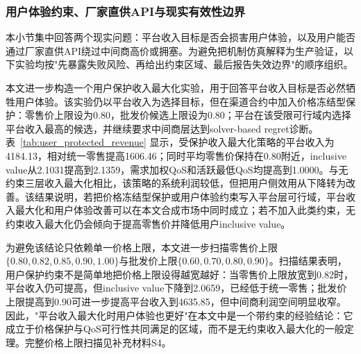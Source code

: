 \documentclass[UTF8,11pt]{ctexart}
\begin{document}
\subsubsection{用户体验约束、厂家直供API与现实有效性边界}
\label{sec:realism_validation}

本小节集中回答两个现实问题：平台收入目标是否会损害用户体验，以及用户能否通过厂家直供API绕过中间商高价或拥塞。为避免把机制仿真解释为生产验证，以下实验均按"先暴露失败风险、再给出约束区域、最后报告失效边界"的顺序组织。

本文进一步构造一个用户保护收入最大化实验，用于回答平台收入目标是否必然牺牲用户体验。该实验仍以平台收入为选择目标，但在渠道合约中加入价格冻结型保护：零售价上限设为0.80，批发价候选上限设为0.80；平台在该受限可行域内选择平台收入最高的候选，并继续要求中间商层达到solver-based regret诊断。表~\ref{tab:user_protected_revenue} 显示，受保护收入最大化策略的平台收入为4184.13，相对统一零售提高1606.46；同时平均零售价保持在0.80附近，inclusive value从2.1031提高到2.1359，需求加权QoS和活跃最低QoS均提高到1.0000。与无约束三层收入最大化相比，该策略的系统利润较低，但把用户侧效用从下降转为改善。该结果说明，若把价格冻结型保护或用户体验约束写入平台层可行域，平台收入最大化和用户体验改善可以在本文合成市场中同时成立；若不加入此类约束，无约束收入最大化仍会倾向于提高零售价并降低用户inclusive value。

\begin{table}[H]
\centering
\caption{用户保护约束下的平台收入最大化}
\label{tab:user_protected_revenue}
\small
{}
\end{table}

为避免该结论只依赖单一价格上限，本文进一步扫描零售价上限$\{0.80,0.82,0.85,0.90,1.00\}$与批发价上限$\{0.60,0.70,0.80,0.90\}$。扫描结果表明，用户保护约束不是简单地把价格上限设得越宽越好：当零售价上限放宽到0.82时，平台收入仍可提高，但inclusive value下降到2.0659，已经低于统一零售；批发价上限提高到0.90可进一步提高平台收入到4635.85，但中间商利润空间明显收窄。因此，"平台收入最大化时用户体验也更好"在本文中是一个带约束的经验结论：它成立于价格保护与QoS可行性共同满足的区域，而不是无约束收入最大化的一般定理。完整价格上限扫描见补充材料S4。
\end{document}
